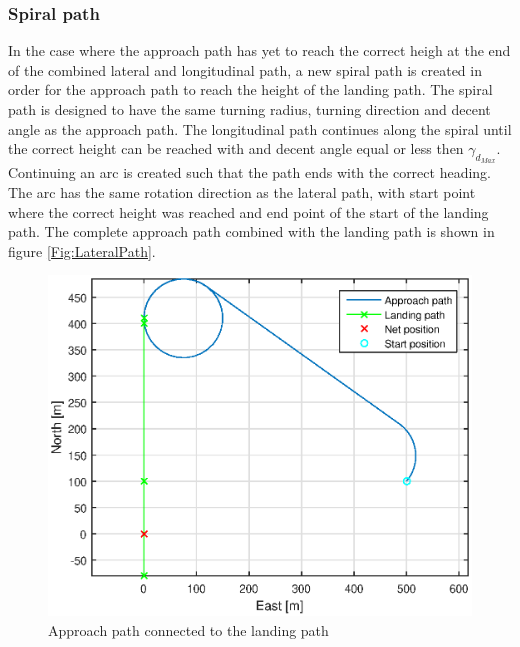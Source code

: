 \subsubsection{Spiral path}\label{pp:SpiralPath}
In the case where the approach path has yet to reach the correct heigh at the end of the combined lateral and longitudinal path, a new spiral path is created in order for the approach path to reach the height of the landing path. The spiral path is designed to have the same turning radius, turning direction and decent angle as the approach path. The longitudinal path continues along the spiral until the correct height can be reached with and decent angle equal or less then $\gamma_{d_{Max}}$. Continuing an arc is created such that the path ends with the correct heading. The arc has the same rotation direction as the lateral path, with start point where the correct height was reached and end point of the start of the landing path. The complete approach path combined with the landing path is shown in figure \ref{Fig:LateralPath}.
\begin{figure}[H]
	\centering
		\includegraphics[scale=0.7]{figs/SysPlot/LandingPath.eps}
		\caption{Approach path connected to the landing path}
		\label{Fig:LandingPath}
\end{figure}

